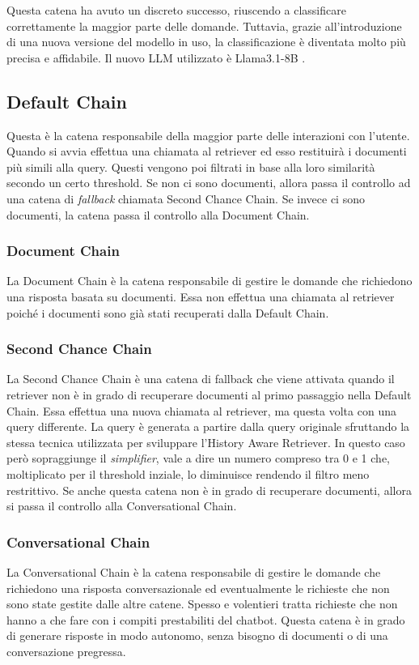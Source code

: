 Questa catena ha avuto un discreto successo, riuscendo a classificare correttamente la maggior parte delle domande. Tuttavia, grazie all'introduzione di una nuova versione del modello in uso, la classificazione è diventata molto più precisa e affidabile. Il nuovo LLM utilizzato è Llama3.1-8B \cite{llama318b}.

\subsection{Default Chain}
\label{sec:defaultchain}
Questa è la catena responsabile della maggior parte delle interazioni con l'utente. Quando si avvia effettua una chiamata al retriever ed esso restituirà i documenti più simili alla query. Questi vengono poi filtrati in base alla loro similarità secondo un certo threshold. Se non ci sono documenti, allora passa il controllo ad una catena di \textit{fallback} chiamata Second Chance Chain. Se invece ci sono documenti, la catena passa il controllo alla Document Chain.

\subsubsection{Document Chain}
La Document Chain è la catena responsabile di gestire le domande che richiedono una risposta basata su documenti. Essa non effettua una chiamata al retriever poiché i documenti sono già stati recuperati dalla Default Chain.

\subsubsection{Second Chance Chain}
La Second Chance Chain è una catena di fallback che viene attivata quando il retriever non è in grado di recuperare documenti al primo passaggio nella Default Chain. Essa effettua una nuova chiamata al retriever, ma questa volta con una query differente. La query è generata a partire dalla query originale sfruttando la stessa tecnica utilizzata per sviluppare l'History Aware Retriever. In questo caso però sopraggiunge il \textit{simplifier}, vale a dire un numero compreso tra 0 e 1 che, moltiplicato per il threshold inziale, lo diminuisce rendendo il filtro meno restrittivo. Se anche questa catena non è in grado di recuperare documenti, allora si passa il controllo alla Conversational Chain.

\subsubsection{Conversational Chain}
La Conversational Chain è la catena responsabile di gestire le domande che richiedono una risposta conversazionale ed eventualmente le richieste che non sono state gestite dalle altre catene. Spesso e volentieri tratta richieste che non hanno a che fare con i compiti prestabiliti del chatbot. Questa catena è in grado di generare risposte in modo autonomo, senza bisogno di documenti o di una conversazione pregressa.

